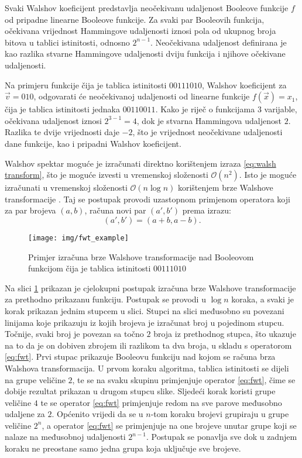 Svaki Walshov koeficijent predstavlja neočekivanu udaljenost  \cite{MeasuringBoolean} Booleove funkcije $f$ od pripadne linearne Booleove funkcije.
Za svaki par Booleovih funkcija, očekivana vrijednost Hammingove udaljenosti iznosi pola od ukupnog broja bitova u tablici istinitosti, odnosno $2^{n-1}$.
Neočekivana udaljenost definirana je kao razlika stvarne Hammingove udaljenosti dviju funkcija i njihove očekivane udaljenosti.

Na primjeru funkcije čija je tablica istinitosti $00111010$, Walshov koeficijent za $\vec{v} = 010$, odgovarati će neočekivanoj udaljenosti od linearne funkcije $f(\vec{x}) = x_1$, čija je tablica istinitosti jednaka $00110011$.
Kako je riječ o funkcijama $3$ varijable, očekivana udaljenost iznosi $2^{3-1} = 4$, dok je stvarna Hammingova udaljenost $2$.
Razlika te dvije vrijednosti daje $-2$, što je vrijednost neočekivane udaljenosti dane funkcije, kao i pripadni Walshov koeficijent.

Walshov spektar moguće je izračunati direktno korištenjem izraza \eqref{eq:walsh transform}, što je moguće izvesti u vremenskoj složenosti $\mathcal{O}(n^2)$.
Isto je moguće izračunati u vremenskoj složenosti $\mathcal{O}(n\log n)$ korištenjem brze Walshove transformacije .
Taj se postupak provodi uzastopnom primjenom operatora koji za par brojeva $(a, b)$, računa novi par $(a', b')$ prema izrazu:
\begin{equation}\label{eq:fwt}
    (a', b') = (a+b, a-b).
\end{equation}
\begin{figure}[ht!] 
    \centering
    \texttt{[image: img/fwt\_example]}
    \captionsetup{justification=centering}
    \caption{Primjer izračuna brze Walshove transformacije nad Booleovom funkcijom čija je tablica istinitosti $00111010$}
    \label{fig:fwt_example}
\end{figure}
Na slici \ref{fig:fwt_example} prikazan je cjelokupni postupak izračuna brze Walshove transformacije za prethodno prikazanu funkciju.
Postupak se provodi u $\log n$ koraka, a svaki je korak prikazan jednim stupcem u slici.
Stupci na slici međusobno su povezani linijama koje prikazuju iz kojih brojeva je izračunat broj u pojedinom stupcu.
Točnije, svaki broj je povezan sa točno $2$ broja iz prethodnog stupca, što ukazuje na to da je on dobiven zbrojem ili razlikom ta dva broja, u skladu s operatorom \eqref{eq:fwt}.
Prvi stupac prikazuje Booleovu funkciju nad kojom se računa brza Walshova transformacija.
U prvom koraku algoritma, tablica istinitosti se dijeli na grupe veličine $2$, te se na svaku skupinu primjenjuje operator \eqref{eq:fwt}, čime se dobije rezultat prikazan u drugom stupcu slike.
Sljedeći korak koristi grupe veličine $4$ te se operator \eqref{eq:fwt} primjenjuje redom na sve parove međusobno udaljene za $2$.
Općenito vrijedi da se u $n$-tom koraku brojevi grupiraju u grupe veličine $2^n$, a operator \eqref{eq:fwt} se primjenjuje na one brojeve unutar grupe koji se nalaze na međusobnoj udaljenosti $2^{n-1}$.
Postupak se ponavlja sve dok u zadnjem koraku ne preostane samo jedna grupa koja uključuje sve brojeve.

